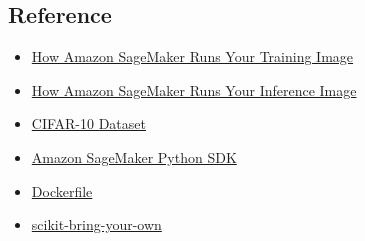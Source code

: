 \documentclass[11pt]{article}
\providecommand{\tightlist}{%
      \setlength{\itemsep}{0pt}\setlength{\parskip}{0pt}}
\begin{document}
    \subsection{Reference}\label{reference}

\begin{itemize}
\tightlist
\item
  \href{https://docs.aws.amazon.com/sagemaker/latest/dg/your-algorithms-training-algo.html}{How
  Amazon SageMaker Runs Your Training Image}
\item
  \href{https://docs.aws.amazon.com/sagemaker/latest/dg/your-algorithms-inference-code.html}{How
  Amazon SageMaker Runs Your Inference Image}
\item
  \href{https://www.cs.toronto.edu/~kriz/cifar.html}{CIFAR-10 Dataset}
\item
  \href{https://github.com/aws/sagemaker-python-sdk}{Amazon SageMaker
  Python SDK}
\item
  \href{https://docs.docker.com/engine/reference/builder/}{Dockerfile}
\item
  \href{https://github.com/awslabs/amazon-sagemaker-examples/blob/master/advanced_functionality/scikit_bring_your_own/scikit_bring_your_own.ipynb}{scikit-bring-your-own}
\end{itemize}


    
    
    
    
\end{document}

